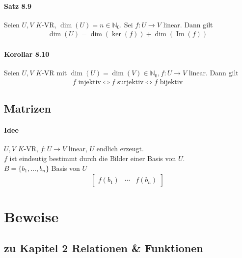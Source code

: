 \documentclass[a5paper, 10pt]{book}
\DeclareMathOperator{\romanIm}{Im}
\newcommand{\inN}{\in\mathbb{N}}
\begin{document}
			\subsubsection{Satz 8.9}
				Seien $U,V$ $K$-VR, $\dim(U) = n \inN_0$. Sei $f: U \to V$ linear. Dann gilt
					\begin{align}
						\dim(U) = \dim(\ker(f)) + \dim(\romanIm(f))
					\end{align}
				
			\subsubsection{Korollar 8.10}
				Seien $U,V$ $K$-VR mit $\dim(U) = \dim(V) \inN_0, f: U \to V$ linear. Dann gilt
				\begin{align}
					f \text{ injektiv} \Longleftrightarrow f \text{ surjektiv} \Longleftrightarrow f \text{ bijektiv}
				\end{align}
			
		\section{Matrizen}
			
			\subsubsection{Idee}
				$U,V$ $K$-VR, $f: U\to V$ linear, $U$ endlich erzeugt.\\
				$f$ ist eindeutig bestimmt durch die Bilder einer Basis von $U$.\\
				$B = \{b_1, \dots, b_n\}$ Basis von $U$\\
				\begin{align}
					\begin{bmatrix}
						f(b_1)	& \cdots	& f(b_n)
					\end{bmatrix}
				\end{align}
		
				
					
			
	\appendix
		
	\chapter{Beweise}
		
		\iffalse
		
		\section{zu Kapitel 2 Relationen \& Funktionen}
		
\end{document}
